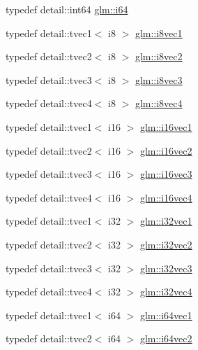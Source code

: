 \begin{DoxyCompactItemize}
\item 
typedef detail\+::int64 \hyperlink{group__gtc__type__precision_gac7a7eaad46064fc952b06df33689da23}{glm\+::i64}
\item 
typedef detail\+::tvec1$<$ i8 $>$ \hyperlink{group__gtc__type__precision_ga7d8b7cc439e81d9deef1477dcbe4bd0b}{glm\+::i8vec1}
\item 
typedef detail\+::tvec2$<$ i8 $>$ \hyperlink{group__gtc__type__precision_ga4d5ac02b48c4c6e1642ae89f9d3f3c7e}{glm\+::i8vec2}
\item 
typedef detail\+::tvec3$<$ i8 $>$ \hyperlink{group__gtc__type__precision_gafd1d80c392c472fc14864ebd8c9316e9}{glm\+::i8vec3}
\item 
typedef detail\+::tvec4$<$ i8 $>$ \hyperlink{group__gtc__type__precision_gad65f6cda14cdf79b2e8afe6ec8ab3725}{glm\+::i8vec4}
\item 
typedef detail\+::tvec1$<$ i16 $>$ \hyperlink{group__gtc__type__precision_ga95c6d9b5d9d140fad7405496484ec622}{glm\+::i16vec1}
\item 
typedef detail\+::tvec2$<$ i16 $>$ \hyperlink{group__gtc__type__precision_gae6b6e6aecc629c6ba90ab75d2a555cdd}{glm\+::i16vec2}
\item 
typedef detail\+::tvec3$<$ i16 $>$ \hyperlink{group__gtc__type__precision_ga431a95adcef90192c0c0f1a6fc05ab4e}{glm\+::i16vec3}
\item 
typedef detail\+::tvec4$<$ i16 $>$ \hyperlink{group__gtc__type__precision_gaa5ac58e1f15cc47ae8f11cf9849cd9be}{glm\+::i16vec4}
\item 
typedef detail\+::tvec1$<$ i32 $>$ \hyperlink{group__gtc__type__precision_gaffde115d86f11a3aa35c294de22eb028}{glm\+::i32vec1}
\item 
typedef detail\+::tvec2$<$ i32 $>$ \hyperlink{group__gtc__type__precision_gaa63418303dbcfc01d53f82f659eab5c1}{glm\+::i32vec2}
\item 
typedef detail\+::tvec3$<$ i32 $>$ \hyperlink{group__gtc__type__precision_ga26740d2ca3314c87950293788455c41a}{glm\+::i32vec3}
\item 
typedef detail\+::tvec4$<$ i32 $>$ \hyperlink{group__gtc__type__precision_gaa8d1842279485fdc4688969980e9d731}{glm\+::i32vec4}
\item 
typedef detail\+::tvec1$<$ i64 $>$ \hyperlink{group__gtc__type__precision_ga1a81383845eb8991d3652848249edeb8}{glm\+::i64vec1}
\item 
typedef detail\+::tvec2$<$ i64 $>$ \hyperlink{group__gtc__type__precision_ga8887703a36c5ef093b74abd9e4640c79}{glm\+::i64vec2}
\item 

\end{DoxyCompactItemize}
